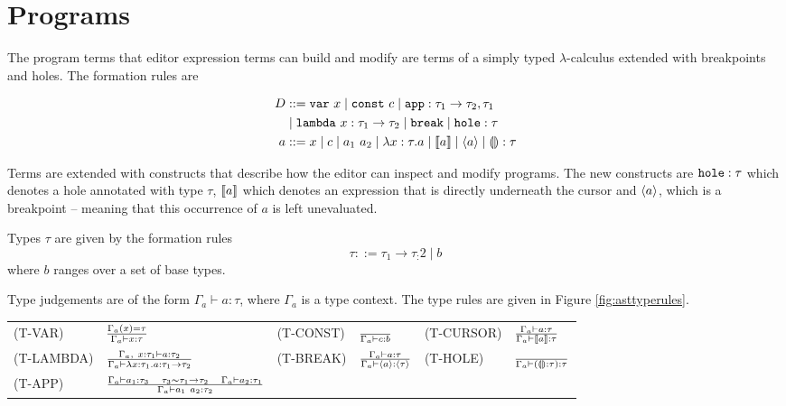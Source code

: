 \section{Programs}

The program terms that editor expression terms can build and modify
are terms of a simply typed $\lambda$-calculus extended with
breakpoints and holes. The formation rules are

\begin{align}
  D & ::= \texttt{var}~x
  \mid \texttt{const}~c
  \mid \texttt{app} : \tau_1\to\tau_2,\tau_1  \\ \label{eq:lan-mod-aam}
&  \mid \texttt{lambda}~x : \tau_1\to\tau_2 
  \mid \texttt{break}
  \mid \texttt{hole} : \tau \\ 
  a & ::= x
  \mid c
  \mid a_1~a_2
  \mid \lambda x : \tau.a
  \mid \llbracket a \rrbracket
  \mid \langle a \rangle
  \mid \llparenthesis\rrparenthesis : \tau \label{eq:lan-mod-ast}
\end{align}

Terms are extended with constructs that describe how the editor can
inspect and modify programs. The new constructs are
$\texttt{hole} : \tau$ which denotes a hole annotated with type
$\tau$, $\llbracket a \rrbracket$ which denotes an expression that is directly
underneath the cursor and $\langle a \rangle$, which is a breakpoint --
meaning that this occurrence of $a$ is left unevaluated.

Types $\tau$ are given by the formation rules
%
\[ \tau ::=  \tau_1 \rightarrow \tau_:2 \mid b \]
%
where $b$ ranges over a set of base types.

Type judgements are of the form $\Gamma_a \vdash a : \tau$, where
$\Gamma_a$ is a type context. The type rules are given in Figure
\ref{fig:asttyperules}.

\begin{figure*}
  \center
  \renewcommand{\arraystretch}{2}
  \begin{tabular}{llllll}
    \scriptsize(T-VAR)    & $ \frac{\Gamma_{a}(x) = \tau} {\Gamma_{a} \vdash x : \tau} $   & \scriptsize(T-CONST) & $ \frac{} {\Gamma_{a} \vdash c : b}$ & \scriptsize(T-CURSOR) & $ \frac{\Gamma_{a} \vdash a : \tau} {\Gamma_{a} \vdash \llbracket a \rrbracket : \tau} $ \\
    \scriptsize(T-LAMBDA) & $ \frac{\Gamma_{a},~x : \tau_1 \vdash a : \tau_2} {\Gamma_{a} \vdash \lambda x : \tau_1.a : \tau_1\to\tau_2}$ & \scriptsize(T-BREAK) & $\frac{\Gamma_{a} \vdash a : \tau} {\Gamma_{a} \vdash \langle a \rangle : \langle \tau \rangle}$  & \scriptsize(T-HOLE)   & $\frac{} {\Gamma_{a} \vdash (\llparenthesis\rrparenthesis : \tau) : \tau}$     \\
    \scriptsize(T-APP)    & $\frac{\Gamma_{a} \vdash a_1 : \tau_3 \quad \tau_3\sim\tau_1\to\tau_2 \quad \Gamma_{a} \vdash a_2 : \tau_1} {\Gamma_{a} \vdash a_1~a_2 : \tau_2}$     &                      &            &                       &
  \end{tabular}
  \caption{AST type rules}
  \label{fig:asttyperules}
\end{figure*}

